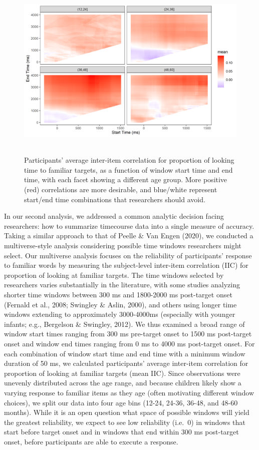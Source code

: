 \documentclass[10pt, letterpaper]{article}
\begin{document}
\begin{figure} 
\includegraphics[width=14cm,height=8.75cm]{../figures/interitem_cors_window_analysis.png}
\caption{Participants' average inter-item correlation for proportion of looking time to familiar targets, as a function of window start time and end time, with each facet showing a different age group. More positive (red) correlations are more desirable, and blue/white represent start/end time combinations that researchers should avoid.}
\label{fig:time_window}
\end{figure}

In our second analysis, we addressed a common analytic decision facing
researchers: how to summarize timecourse data into a single measure of
accuracy. Taking a similar approach to that of Peelle \& Van Engen
(2020), we conducted a multiverse-style analysis considering possible
time windows researchers might select. Our multiverse analysis focuses
on the reliability of participants' response to familiar words by
measuring the subject-level inter-item correlation (IIC) for proportion
of looking at familiar targets. The time windows selected by researchers
varies substantially in the literature, with some studies analyzing
shorter time windows between 300 ms and 1800-2000 ms post-target onset
(Fernald et al., 2008; Swingley \& Aslin, 2000), and others using longer
time windows extending to approximately 3000-4000ms (especially with
younger infants; e.g., Bergelson \& Swingley, 2012). We thus examined a
broad range of window start times ranging from 300 ms pre-target onset
to 1500 ms post-target onset and window end times ranging from 0 ms to
4000 ms post-target onset. For each combination of window start time and
end time with a minimum window duration of 50 ms, we calculated
participants' average inter-item correlation for proportion of looking
at familiar targets (mean IIC). Since observations were unevenly
distributed across the age range, and because children likely show a
varying response to familiar items as they age (often motivating
different window choices), we split our data into four age bins (12-24,
24-36, 36-48, and 48-60 months). While it is an open question what space
of possible windows will yield the greatest reliability, we expect to
see low reliability (i.e.~0) in windows that start before target onset
and in windows that end within 300 ms post-target onset, before
participants are able to execute a response.
\end{document}
